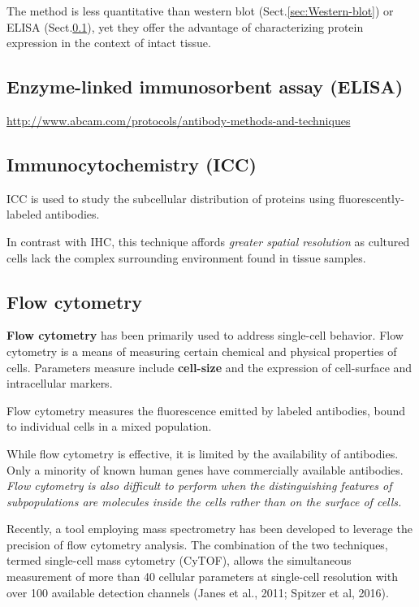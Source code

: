 The method is less quantitative than western blot
(Sect.\ref{sec:Western-blot}) or ELISA (Sect.\ref{sec:ELISA}), yet they offer
the advantage of characterizing protein expression in the context of intact
tissue.

\subsection{Enzyme-linked immunosorbent assay (ELISA)}
\label{sec:ELISA}


\url{http://www.abcam.com/protocols/antibody-methods-and-techniques}

\subsection{Immunocytochemistry (ICC)}
\label{sec:ICC}
\label{sec:immunocytochemistry}

ICC is used to study the subcellular distribution of proteins using
fluorescently-labeled antibodies.

In contrast with IHC, this technique affords {\it greater spatial resolution} as
cultured cells lack the complex surrounding environment found in tissue samples.

\subsection{Flow cytometry}
\label{sec:Flow-cytometry}
\label{sec:flow-cytometry}

{\bf Flow cytometry} has been primarily used to address single-cell behavior. 
Flow cytometry is a means of measuring certain chemical and physical properties
of cells. Parameters measure include {\bf cell-size} and the expression of
cell-surface and intracellular markers. 

Flow cytometry measures the fluorescence emitted by labeled antibodies, bound to
individual cells in a mixed population.

While flow cytometry is effective, it is limited by the availability of
antibodies. Only a minority of known human genes have commercially available
antibodies. {\it Flow cytometry is also difficult to perform when the
distinguishing features of subpopulations are molecules inside the cells rather
than on the surface of cells.}

Recently, a tool employing mass spectrometry has been developed to leverage the
precision of flow cytometry analysis. The combination of the two techniques,
termed single-cell mass cytometry (CyTOF), allows the simultaneous measurement
of more than 40 cellular parameters at single-cell resolution with over 100
available detection channels (Janes et al., 2011; Spitzer et al, 2016).

